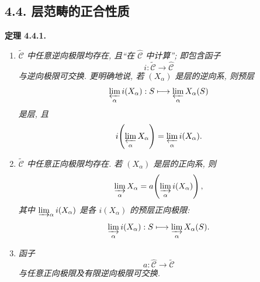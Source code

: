 
\setcounter{footnote}{29}

\subsection*{4.4. 层范畴的正合性质}

\medskip
\noindent{}\textbf{定理 4.4.1.}
\begin{enumerate}
  \item[(i)]
    \textit{\(\widetilde{\mathscr C}\) 中任意逆向极限均存在,
    且\textquotedblleft 在 \(\widehat{\mathscr C}\) 中计算\textquotedblright;
    即包含函子
    \[
      i:\widetilde{\mathscr C}\longrightarrow\widehat{\mathscr C}
    \]
    与逆向极限可交换. 更明确地说, 若 \((X_\alpha)\) 是层的逆向系, 则预层}
    \[
      \varprojlim_\alpha i(X_\alpha):
      S\longmapsto\varprojlim_\alpha X_\alpha(S)
    \]
    \textit{是层, 且}
    \[
      i\!\left(\varprojlim_\alpha X_\alpha\right)
      =\varprojlim_\alpha i(X_\alpha).
    \]

  \item[(ii)]
    \textit{\(\widetilde{\mathscr C}\) 中任意正向极限均存在.
    若 \((X_\alpha)\) 是层的正向系, 则}
    \[
      \varinjlim_\alpha X_\alpha
      =a\!\left(\varinjlim_\alpha i(X_\alpha)\right),
    \]
    \textit{其中 \(\varinjlim_\alpha i(X_\alpha)\)
    是各 \(i(X_\alpha)\) 的预层正向极限:}
    \[
      \varinjlim_\alpha i(X_\alpha):
      S\longmapsto\varinjlim_\alpha X_\alpha(S).
    \]

  \item[(iii)] \textit{函子}
    \[
      a:\widehat{\mathscr C}\longrightarrow\widetilde{\mathscr C}
    \]
    \textit{与任意正向极限及有限逆向极限可交换.}
\end{enumerate}

